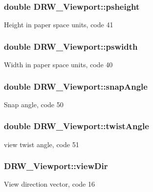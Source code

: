 \subsubsection[{psheight}]{\setlength{\rightskip}{0pt plus 5cm}double D\+R\+W\+\_\+\+Viewport\+::psheight}\label{class_d_r_w___viewport_af462ca77d7463df5319af366846b6494}
Height in paper space units, code 41 \hypertarget{class_d_r_w___viewport_a3d0d03d4fc2c8a3edb3f1ad6e2cdcf2e}{}
\subsubsection[{pswidth}]{\setlength{\rightskip}{0pt plus 5cm}double D\+R\+W\+\_\+\+Viewport\+::pswidth}\label{class_d_r_w___viewport_a3d0d03d4fc2c8a3edb3f1ad6e2cdcf2e}
Width in paper space units, code 40 \hypertarget{class_d_r_w___viewport_a6ad208870366d62263d0a6ae190ab4bc}{}
\subsubsection[{snap\+Angle}]{\setlength{\rightskip}{0pt plus 5cm}double D\+R\+W\+\_\+\+Viewport\+::snap\+Angle}\label{class_d_r_w___viewport_a6ad208870366d62263d0a6ae190ab4bc}
Snap angle, code 50 \hypertarget{class_d_r_w___viewport_a0d16a6058735a91ca33cf9b19383ff69}{}
\subsubsection[{twist\+Angle}]{\setlength{\rightskip}{0pt plus 5cm}double D\+R\+W\+\_\+\+Viewport\+::twist\+Angle}\label{class_d_r_w___viewport_a0d16a6058735a91ca33cf9b19383ff69}
view twist angle, code 51 \hypertarget{class_d_r_w___viewport_a7ef3ded922fc5a3c5edd5b8da8a3d3d8}{}
\subsubsection[{view\+Dir}]{ D\+R\+W\+\_\+\+Viewport\+::view\+Dir}\label{class_d_r_w___viewport_a7ef3ded922fc5a3c5edd5b8da8a3d3d8}
View direction vector, code 16 \hypertarget{class_d_r_w___viewport_a58791e7b528bdaaa6f1ca0572c7321ea}{}
